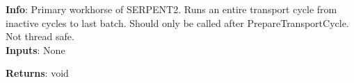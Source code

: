 \textbf{Info}: Primary workhorse of SERPENT2. Runs an entire transport cycle from
inactive cycles to last batch. Should only be called after PrepareTransportCycle.
Not thread safe. \\

\noindent \textbf{Inputs}: None

\noindent \textbf{Returns}: void
